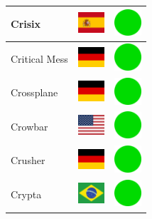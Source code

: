 \documentclass[12pt, a4paper, twoside]{report}
\begin{document}
\begin{center}
\begin{longtable}{|p{5cm}|p{2cm}|p{2cm}|}
Crisix & \includegraphics[width=1cm]{4x3/es} & \includegraphics[width=1cm]{likes/y} \\ \hline
Critical Mess & \includegraphics[width=1cm]{4x3/de} & \includegraphics[width=1cm]{likes/y} \\ \hline
Crossplane & \includegraphics[width=1cm]{4x3/de} & \includegraphics[width=1cm]{likes/y} \\ \hline
Crowbar & \includegraphics[width=1cm]{4x3/us} & \includegraphics[width=1cm]{likes/y} \\ \hline
Crusher & \includegraphics[width=1cm]{4x3/de} & \includegraphics[width=1cm]{likes/y} \\ \hline
Crypta & \includegraphics[width=1cm]{4x3/br} & \includegraphics[width=1cm]{likes/y} \\ \hline

\end{longtable}
\end{center}
\end{document}

